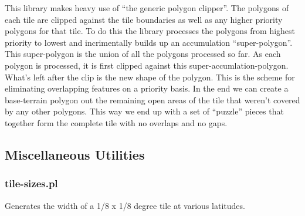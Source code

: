 \documentclass[12pt]{article}
\begin{document}
This library makes heavy use of ``the generic polygon clipper''.  The
polygons of each tile are clipped against the tile boundaries as well
as any higher priority polygons for that tile.  To do this the library
processes the polygons from highest priority to lowest and
incrimentally builds up an accumulation ``super-polygon''.  This
super-polygon is the union of all the polygons processed so far.  As
each polygon is processed, it is first clipped against this
super-accumlation-polygon.  What's left after the clip is the new
shape of the polygon.  This is the scheme for eliminating overlapping
features on a priority basis.  In the end we can create a base-terrain
polygon out the remaining open areas of the tile that weren't covered
by any other polygons.  This way we end up with a set of ``puzzle''
pieces that together form the complete tile with no overlaps and no
gaps.


% 


\subsection{Miscellaneous Utilities}

\subsubsection{tile-sizes.pl}

Generates the width of a 1/8 x 1/8 degree tile at various latitudes.
\end{document}

